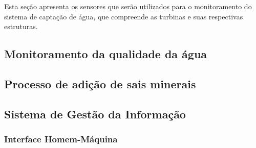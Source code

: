       Esta seção apresenta os sensores que serão utilizados para o monitoramento do sistema de captação
      de água, que compreende as turbinas e suas respectivas estruturas.
      
      
      
      
      
    \subsection{Monitoramento da qualidade da água}
    
      
    
    \pagebreak
    \subsection{Processo de adição de sais minerais}
    
      
    
    \vfill
    
    \pagebreak
    \subsection{Sistema de Gestão da Informação}
      
      
    \subsubsection{Interface Homem-Máquina}
      	

    
    
    
    
    
